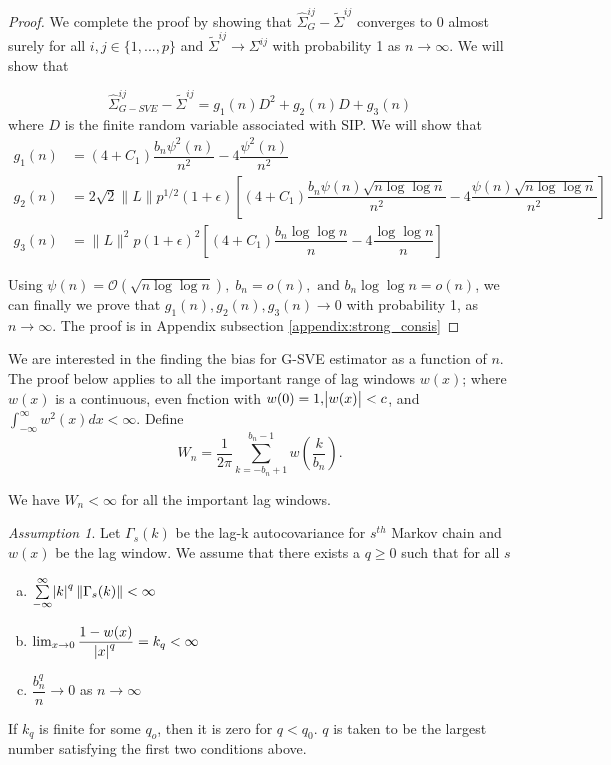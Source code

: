 \documentclass[11pt]{article}
\theoremstyle{remark}
\newtheorem{ass}{Assumption}
\begin{document}
\begin{proof}
We complete the proof by showing that $\hat{\Sigma}_{G}^{ij} - \tilde{\Sigma}^{ij}$ converges to 0 almost surely for all $i,j \in \{1,...,p\}$ and $\tilde{\Sigma}^{ij} \to \Sigma^{ij}$ with probability 1 as $n \to \infty$. We will show that 

\[
\hat{\Sigma}_{G-SVE}^{ij} - \tilde{\Sigma}^{ij} = g_1(n)D^2 + g_2(n)D + g_3(n)
\]
where $D$ is the finite random variable associated with SIP. We will show that
\begin{align*}
    g_1(n) &= (4+C_1)\dfrac{b_n \psi^2(n)}{n^2} - 4\dfrac{\psi^2(n)}{n^2}\\
    g_2(n) &= 2\sqrt{2}\|L\|p^{1/2}(1+\epsilon)\left[(4+C_1)\dfrac{b_n\psi(n)\sqrt{n\log \log n}}{n^2} - 4\dfrac{\psi(n)\sqrt{n\log \log n}}{n^2}\right]\\
    g_3(n) &= \|L\|^2 p (1+\epsilon)^2\left[(4+C_1)\dfrac{b_n \log\log n}{n} - 4 \dfrac{\log \log n}{n}\right]
\end{align*}

Using $\psi(n) = \mathcal{O}(\sqrt{n \log \log n}),\; b_n = o(n), \textrm{ and } b_n \log \log n = o(n)$, we can finally we prove that $g_1(n), g_2(n), g_3(n) \to 0$ with probability 1, as $n \to \infty$. The proof is in Appendix subsection \ref{appendix:strong_consis}
\end{proof}

We are interested in the finding the bias for G-SVE estimator as a function of $n$. The proof below applies to all the important range of lag windows $w(x)$; where $w(x)$ is a continuous, even fnction with $w(0)=1, \abs{w(x)} < c$, and $\int_{-\infty}^{\infty}w^2(x)dx < \infty$. Define
%
\[
W_n = \dfrac{1}{2\pi}\sum_{k=-b_n+1}^{b_n-1}w\left(\dfrac{k}{b_n}\right).
\]

We have $W_n < \infty$ for all the important lag windows.

\begin{ass} \label{ass:bias}
    Let $\Gamma_s(k)$ be the lag-k autocovariance for $s^{th}$ Markov chain and $w(x)$ be the lag window. We assume that there exists a $q \geq 0$ such that for all $s$
    \begin{enumerate} [a.]
        \item $\sum\limits_{-\infty}^{\infty}\abs{k}^q \|\Gamma_s(k)\| < \infty$
        \item $\lim _{x \to 0}\dfrac{1 - w(x)}{\abs{x}^q} = k_q < \infty$
        \item $\dfrac{b_n^q}{n} \to 0$ as $n \to \infty$
    \end{enumerate}
    
    If $k_q$ is finite for some $q_o$, then it is zero for $q < q_0$. $q$ is taken to be the largest number satisfying the first two conditions above.
\end{ass}
\end{document}
